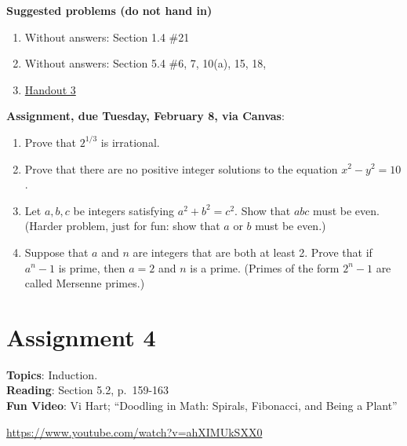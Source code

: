 \documentclass[12pt]{article}
\begin{document}
\noindent \textbf{Suggested problems (do not hand in)}

\begin{enumerate}
\item Without answers: Section 1.4 \#21
\item Without answers: Section 5.4 \#6, 7, 10(a), 15, 18,
\item \href{https://www.math.emory.edu/~dzb/teaching/250Fall2021/handouts/250-H03-contradiction.pdf}{Handout 3}
\end{enumerate}


\noindent \textbf{Assignment, due Tuesday, February 8, via Canvas}:
\begin{enumerate}
\item Prove that $2^{1/3}$ is irrational.
\item Prove that there are no positive integer solutions to the equation $x^2 - y^2 = 10$.
\item Let $a, b, c$ be integers satisfying $a^2 + b^2 = c^2$. Show that $abc$ must be even. (Harder problem, just for fun: show that $a$ or $b$ must be even.)
\item Suppose that $a$ and $n$ are integers that are both at least 2. Prove that if $a^n -1$ is prime, then $a = 2$ and $n$ is a prime. (Primes of the form $2^n - 1$ are called Mersenne primes.)
\end{enumerate}



\newpage
\section[4 (due February 15): Induction.]{Assignment 4}

\textbf{Topics}: Induction.
\\

\noindent \textbf{Reading}: Section 5.2, p.~159-163
\\

\noindent \textbf{Fun Video}: Vi Hart; ``Doodling in Math: Spirals, Fibonacci, and Being a Plant''

\noindent \url{https://www.youtube.com/watch?v=ahXIMUkSXX0}
\\ 
\end{document}
